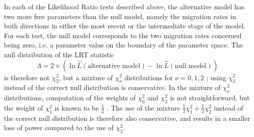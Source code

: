 \documentclass[11pt]{article}
\begin{document}
In each of the Likelihood Ratio tests described above, the alternative model has two more free parameters than the null model, namely the migration rates in both directions in either the most recent or the intermediate stage of the model. For each test, the null model corresponds to the two migration rates concerned being zero, i.e. a parameter value on the boundary of the parameter space. 
The null distribution of the LRT statistic
$$\Lambda=2 \times \left(\ln\hat{L}(\mbox{alternative model})-\ln\hat{L}(\mbox{null 
model}) \right)$$
is therefore not $\chi^2_2$, but a mixture of $\chi^2_{\nu}$ distributions for $\nu=0,1,2$ \citep{Self1987, Silvapulle2005}; using $\chi^2_2$ instead of the correct null distribution is conservative. In the mixture of $\chi^2_{\nu}$ distributions, computation of the weights of $\chi^2_{0}$ and $\chi^2_{2}$ is not straightforward, but the weight of $\chi^2_{1}$ is known to be $\frac{1}{2}$ \citep{Self1987, Silvapulle2005}. The use of the mixture $\frac{1}{2} \chi^2_1 +\frac{1}{2} \chi^2_2$
 instead of the correct null distribution is therefore also conservative, and results in a smaller loss of power compared to the use of $\chi^2_2$.
\end{document}
